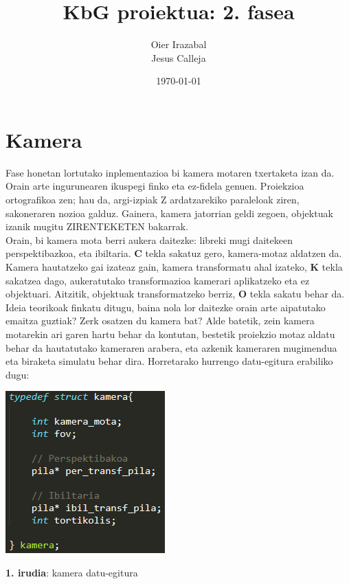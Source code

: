 \documentclass[12pt]{article}
\title{KbG proiektua: 2. fasea}
\author{
        Oier Irazabal\\
        Jesus Calleja
}
\date{\today}
\newcommand{\tekla}[1] {\textbf{#1}}
\begin{document}
\maketitle


\tableofcontents

\vspace{2cm}
\begin{center}
\end{center}

\pagebreak

\section{Kamera}

Fase honetan lortutako inplementazioa bi kamera motaren txertaketa izan da. Orain arte ingurunearen ikuspegi finko eta ez-fidela genuen. Proiekzioa ortografikoa zen; hau da, argi-izpiak Z ardatzarekiko paraleloak ziren, sakoneraren nozioa galduz. Gainera, kamera jatorrian geldi zegoen, objektuak izanik mugitu ZIRENTEKETEN bakarrak.\\

Orain, bi kamera mota berri aukera daitezke: libreki mugi daitekeen perspektibazkoa, eta ibiltaria. \tekla{C} tekla sakatuz gero, kamera-motaz aldatzen da. Kamera hautatzeko gai izateaz gain, kamera transformatu ahal izateko, \tekla{K} tekla sakatzea dago, aukeratutako transformazioa kamerari aplikatzeko eta ez objektuari. Aitzitik, objektuak transformatzeko berriz, \tekla{O} tekla sakatu behar da.\\

Ideia teorikoak finkatu ditugu, baina nola lor daitezke orain arte aipatutako emaitza guztiak? Zerk osatzen du kamera bat?
Alde batetik, zein kamera motarekin ari garen hartu behar da kontutan, bestetik proiekzio motaz aldatu behar da hautatutako kameraren arabera, eta azkenik kameraren mugimendua eta biraketa simulatu behar dira. Horretarako hurrengo datu-egitura erabiliko dugu:

\begin{center}
\includegraphics[scale=1]{kamera_struct.png}

\textbf{1. irudia}: kamera datu-egitura
\end{center}
\end{document}
